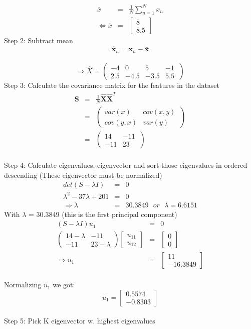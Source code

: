 \documentclass[a4paper, 12pt]{report}
\begin{document}
\begin{eqnarray*}
\bar{x} &=& \frac{1}{N}\sum_{n=1}^N x_n\\
\Leftrightarrow \bar{x}&=&\begin{bmatrix} 8\\ 8.5 \end{bmatrix}
\end{eqnarray*}
\indent Step 2: Subtract mean
$$\hat{\mathbf{x}}_n = \mathbf{x}_n - \bar{\mathbf{x}}$$\
$$\Rightarrow \hat{X}=\begin{pmatrix} -4 & 0 & 5 & -1\ \\ 2.5 & -4.5 & -3.5 & 5.5 \end{pmatrix}$$
\indent Step 3: Calculate the covariance matrix for the features in the dataset
\begin{eqnarray*}
    \mathbf{S} &=& \frac{1}{N}\hat{\mathbf{X}}\hat{\mathbf{X}}^T\\
    &=& \begin{pmatrix} var(x) & cov(x,y)\ \\ cov(y,x) & var(y)  \end{pmatrix}\\
    &=& \begin{pmatrix} 14 & -11\ \\ -11 & 23  \end{pmatrix}
\end{eqnarray*}\\
\indent Step 4: Calculate eigenvalues, eigenvector and sort those eigenvalues in ordered descending (These eigenvector must be normalized)\\
\begin{eqnarray*}
det(S - \lambda I ) &=& 0\\
\lambda^2 - 37\lambda + 201&=&  0\\
\Rightarrow \lambda &=& 30.3849 ~~~ or ~~~ \lambda  =  6.6151   
\end{eqnarray*}
\indent With  $\lambda$ = 30.3849 (this is the first principal component) 
\begin{eqnarray*}
    (S - \lambda I) u_1 &=& 0\\
    \begin{pmatrix} 14- \lambda&-11\\ -11 & 23 - \lambda \end{pmatrix}\begin{bmatrix} u_{11}\\ u_{12} \end{bmatrix}&=&\begin{bmatrix} 0\\ 0 \end{bmatrix}\\
    \Rightarrow u_1&=& \begin{bmatrix} 11\\ -16.3849 \end{bmatrix}
\end{eqnarray*}\\
\indent Normalizing $u_1$ we got:
$$  u_1 = \begin{bmatrix} 0.5574\\ -0.8303 \end{bmatrix} $$\\
\indent Step 5:  Pick K eigenvector w. highest eigenvalues
\end{document}
